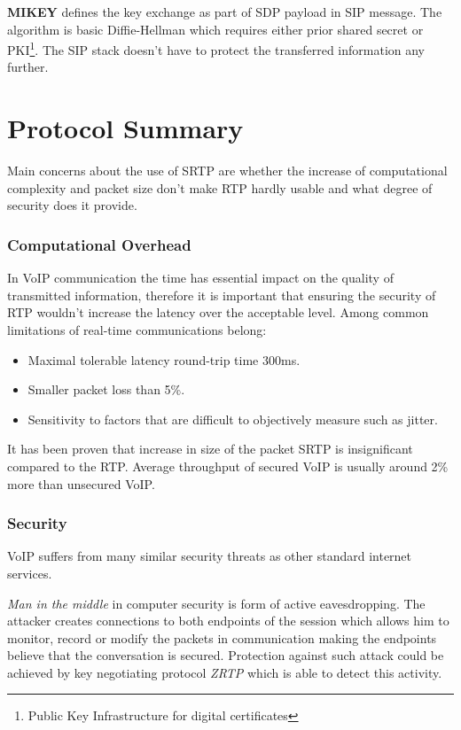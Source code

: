 \textbf{MIKEY} defines the key exchange as part of SDP payload in SIP message.
The algorithm is basic Diffie-Hellman which requires either prior shared secret
or PKI\footnote{ Public Key Infrastructure for digital certificates}. The SIP 
stack doesn't have to protect the transferred information any further.



\section{Protocol Summary}
Main concerns about the use of SRTP are whether the increase of computational
complexity and packet size don't make RTP hardly usable and what degree of
security does it provide.

\subsubsection*{Computational Overhead}
In VoIP communication the time has essential impact on the quality of
transmitted information, therefore it is important that ensuring the 
security of RTP wouldn't increase the latency over the acceptable level.
Among common limitations of real-time communications 
belong\cite{perkins:rtp2003}:
\begin{itemize}
\item Maximal tolerable latency round-trip time 300ms.
\item Smaller packet loss than 5\%.
\item Sensitivity to factors that are difficult to objectively measure
such as jitter.
\end{itemize}

It has been proven that increase in size of the packet SRTP is
insignificant compared to the RTP\cite{srtp:analysis2, srtp:analysis1}.
Average throughput of secured VoIP is usually around 2\% more than 
unsecured VoIP.



\subsubsection*{Security}
VoIP suffers from many similar security threats as other standard internet
services. 

\textit{Man in the middle}\label{mitm} in computer security is form of active 
eavesdropping. The attacker creates connections to both endpoints of the session
which allows him to monitor, record or modify the packets in communication 
making the endpoints believe that the conversation is secured. 
Protection against such attack could be achieved by key negotiating protocol
\textit{ZRTP} which is able to detect this activity\cite{rfc6189}.

